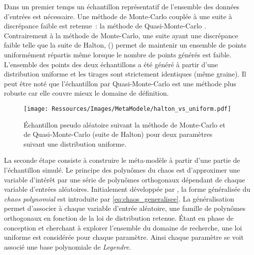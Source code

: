 Dans un premier temps un échantillon représentatif de l’ensemble des données d’entrées est
nécessaire. Une méthode de Monte-Carlo couplée à une suite à discrépance faible est retenue~: la
méthode de Quasi-Monte-Carlo \parencite{Caflisch19981}. Contrairement à la méthode de
Monte-Carlo, une suite ayant une discrépance faible telle que la suite de Halton,
() permet de maintenir un ensemble de
points uniformément répartis même lorsque le nombre de points générés est faible.
L’ensemble des points des deux échantillons a été généré à partir d’une
distribution uniforme et les tirages sont strictement identiques (même graine).
Il peut être noté que l’échantillon par Quasi-Monte-Carlo est une méthode plus robuste car elle
couvre mieux le domaine de définition.
\begin{figure}
    \centering
    \texttt{[image: Ressources/Images/MetaModele/halton\_vs\_uniform.pdf]}
    \caption[Échantillon suivant la méthode de Monte-Carlo et de Quasi-Monte-Carlo]
            {Échantillon pseudo aléatoire suivant la méthode de Monte-Carlo et de
             Quasi-Monte-Carlo (suite de Halton) pour deux paramètres suivant une
             distribution uniforme.}
    \label{fig:halton_vs_uniform}
\end{figure}

La seconde étape consiste à construire le méta-modèle à partir d’une partie de
l’échantillon simulé. Le principe des polynômes du chaos est
d’approximer une variable d’intérêt par une série de polynômes orthogonaux dépendant de
chaque variable d’entrées aléatoires. Initialement développée par \textcite{Wiener1938897},
la forme généralisée du \textit{chaos polynomial} est introduite par \textcite{Xiu2002619}
\eqref{eq:chaos_generalisee}. La généralisation permet d’associer à chaque variable
d’entrée aléatoire, une famille de polynômes orthogonaux en fonction de la loi de
distribution retenue. Étant en phase de conception et cherchant à explorer l’ensemble du
domaine de recherche, une loi uniforme est considérée pour chaque paramètre. Ainsi chaque
paramètre se voit associé une base polynomiale de \textit{Legendre}.

